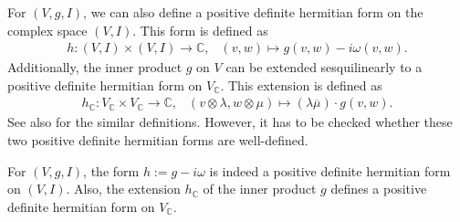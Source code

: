 For $(V,g,I)$, we can also define a positive definite hermitian form on the complex space $(V,I)$. 
This form is defined as 
\begin{align*}
	h: (V,I) \times (V,I) \rightarrow \mathbb{C},\;\enspace
	(v,w) \mapsto g(v,w) - i\omega(v,w).
\end{align*}
Additionally, the inner product $g$ on $V$ can be extended sesquilinearly to a positive definite
hermitian form on $V_\mathbb{C}$. This extension is defined as
\begin{align*}
	h_\mathbb{C} : V_\mathbb{C} \times V_\mathbb{C} \rightarrow \mathbb{C},\; \enspace 
	(v \otimes \lambda, w \otimes \mu) \mapsto (\lambda \overline{\mu}) \cdot g(v,w).
\end{align*}
See also \cite[p.\,30]{Huybrechts2004} for the similar definitions.
However, it has to be checked whether these two positive definite hermitian forms are well-defined.
\begin{prop}
	For $(V,g,I)$, the form $h:= g- i\omega$ is indeed a positive definite
	hermitian form on $(V,I)$. Also, the extension $h_\mathbb{C}$ of the inner product $g$ defines a
	positive definite hermitian form on $V_\mathbb{C}$.
\end{prop}
